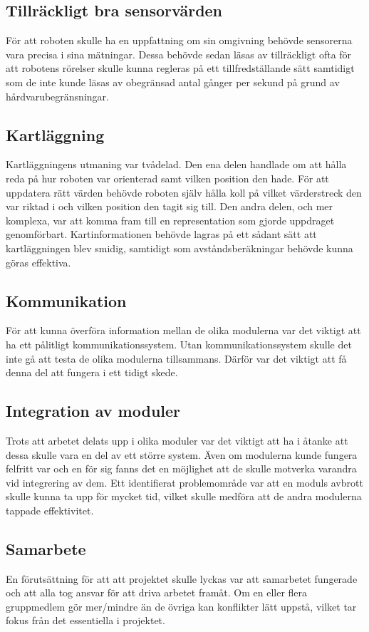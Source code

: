 \documentclass[11pt]{article}
\begin{document}
\begin{flushleft}
\subsection{Tillräckligt bra sensorvärden}
För att roboten skulle ha en uppfattning om sin omgivning behövde sensorerna vara precisa i sina mätningar. Dessa behövde sedan läsas av tillräckligt ofta för att robotens rörelser skulle kunna regleras på ett tillfredställande sätt samtidigt som de inte kunde läsas av obegränsad antal gånger per sekund på grund av hårdvarubegränsningar.

\subsection{Kartläggning}
Kartläggningens utmaning var tvådelad. Den ena delen handlade om att hålla reda på hur roboten var orienterad samt vilken position den hade. För att uppdatera rätt värden behövde roboten själv hålla koll på vilket värderstreck den var riktad i och vilken position den tagit sig till. Den andra delen, och mer komplexa, var att komma fram till en representation som gjorde uppdraget genomförbart. Kartinformationen behövde lagras på ett sådant sätt att kartläggningen blev smidig, samtidigt som avståndsberäkningar behövde kunna göras effektiva.

\subsection{Kommunikation}
För att kunna överföra information mellan de olika modulerna var det viktigt att ha ett pålitligt kommunikationssystem. Utan kommunikationssystem skulle det inte gå att testa de olika modulerna tillsammans. Därför var det viktigt att få denna del att fungera i ett tidigt skede.

\subsection{Integration av moduler}
Trots att arbetet delats upp i olika moduler var det viktigt att ha i åtanke att dessa skulle vara en del av ett större system. Även om modulerna kunde fungera felfritt var och en för sig fanns det en möjlighet att de skulle motverka varandra vid integrering av dem. Ett identifierat problemområde var att en moduls avbrott skulle kunna ta upp för mycket tid, vilket skulle medföra att de andra modulerna tappade effektivitet. 

\subsection{Samarbete}
En förutsättning för att att projektet skulle lyckas var att samarbetet fungerade och att alla tog ansvar för att driva arbetet framåt. Om en eller flera gruppmedlem gör mer/mindre än de övriga kan konflikter lätt uppstå, vilket tar fokus från det essentiella i projektet.



\end{flushleft}
\end{document}
